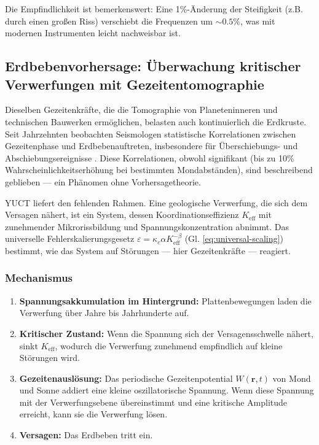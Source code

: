 \documentclass[12pt,a4paper]{article}
\theoremstyle{remark}
\begin{document}
	Die Empfindlichkeit ist bemerkenswert: Eine 1\%-Änderung der Steifigkeit (z.B. durch einen großen Riss) verschiebt die Frequenzen um \(\sim 0.5\%\), was mit modernen Instrumenten leicht nachweisbar ist.
	
	\subsection{Erdbebenvorhersage: Überwachung kritischer Verwerfungen mit Gezeitentomographie}
	\label{sec:earthquakes}
	
	Dieselben Gezeitenkräfte, die die Tomographie von Planeteninneren und technischen Bauwerken ermöglichen, belasten auch kontinuierlich die Erdkruste. Seit Jahrzehnten beobachten Seismologen statistische Korrelationen zwischen Gezeitenphase und Erdbebenauftreten, insbesondere für Überschiebungs- und Abschiebungsereignisse \cite{Tanaka2012, Tolstoy2013, Sibgatulin2014, RAN2025}. Diese Korrelationen, obwohl signifikant (bis zu 10\% Wahrscheinlichkeitserhöhung bei bestimmten Mondabständen), sind beschreibend geblieben — ein Phänomen ohne Vorhersagetheorie.
	
	YUCT liefert den fehlenden Rahmen. Eine geologische Verwerfung, die sich dem Versagen nähert, ist ein System, dessen Koordinationseffizienz \(K_{\mathrm{eff}}\) mit zunehmender Mikrorissbildung und Spannungskonzentration abnimmt. Das universelle Fehlerskalierungsgesetz \(\varepsilon = \kappa_c \alpha K_{\mathrm{eff}}^{-\beta}\) (Gl. \ref{eq:universal-scaling}) bestimmt, wie das System auf Störungen — hier Gezeitenkräfte — reagiert.
	
	\subsubsection{Mechanismus}
	
	\begin{enumerate}
		\item \textbf{Spannungsakkumulation im Hintergrund:} Plattenbewegungen laden die Verwerfung über Jahre bis Jahrhunderte auf.
		\item \textbf{Kritischer Zustand:} Wenn die Spannung sich der Versagensschwelle nähert, sinkt \(K_{\mathrm{eff}}\), wodurch die Verwerfung zunehmend empfindlich auf kleine Störungen wird.
		\item \textbf{Gezeitenauslösung:} Das periodische Gezeitenpotential \(W(\mathbf{r},t)\) von Mond und Sonne addiert eine kleine oszillatorische Spannung. Wenn diese Spannung mit der Verwerfungsebene übereinstimmt und eine kritische Amplitude erreicht, kann sie die Verwerfung lösen.
		\item \textbf{Versagen:} Das Erdbeben tritt ein.
	\end{enumerate}
	
\end{document}

